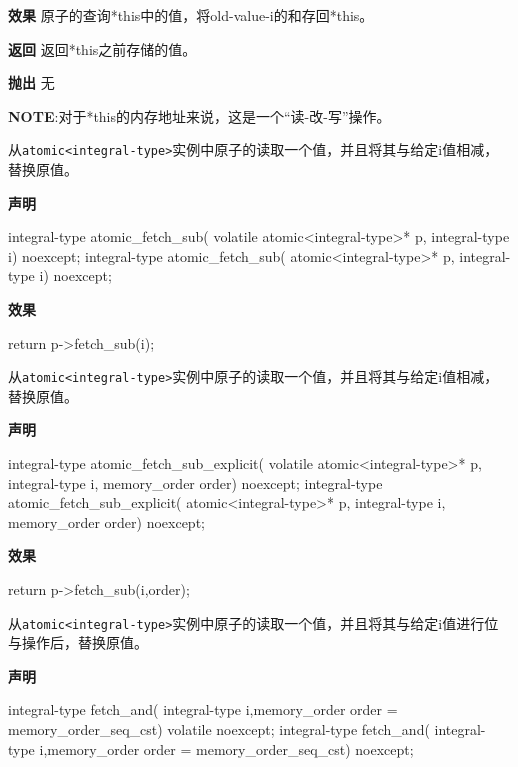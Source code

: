 \textbf{效果}
原子的查询*this中的值，将old-value-i的和存回*this。

\textbf{返回}
返回*this之前存储的值。

\textbf{抛出}
无

\textbf{NOTE}:对于*this的内存地址来说，这是一个“读-改-写”操作。


从\texttt{atomic<integral-type>}实例中原子的读取一个值，并且将其与给定i值相减，替换原值。

\textbf{声明}

\begin{cpp}
integral-type atomic_fetch_sub(
    volatile atomic<integral-type>* p, integral-type i) noexcept;
integral-type atomic_fetch_sub(
    atomic<integral-type>* p, integral-type i) noexcept;
\end{cpp}

\textbf{效果}

\begin{cpp}
return p->fetch_sub(i);
\end{cpp}


从\texttt{atomic<integral-type>}实例中原子的读取一个值，并且将其与给定i值相减，替换原值。

\textbf{声明}

\begin{cpp}
integral-type atomic_fetch_sub_explicit(
    volatile atomic<integral-type>* p, integral-type i,
    memory_order order) noexcept;
integral-type atomic_fetch_sub_explicit(
    atomic<integral-type>* p, integral-type i, memory_order order)
    noexcept;
\end{cpp}

\textbf{效果}

\begin{cpp}
return p->fetch_sub(i,order);
\end{cpp}


从\texttt{atomic<integral-type>}实例中原子的读取一个值，并且将其与给定i值进行位与操作后，替换原值。

\textbf{声明}

\begin{cpp}
integral-type fetch_and(
    integral-type i,memory_order order = memory_order_seq_cst)
    volatile noexcept;
integral-type fetch_and(
    integral-type i,memory_order order = memory_order_seq_cst) noexcept;
\end{cpp}

